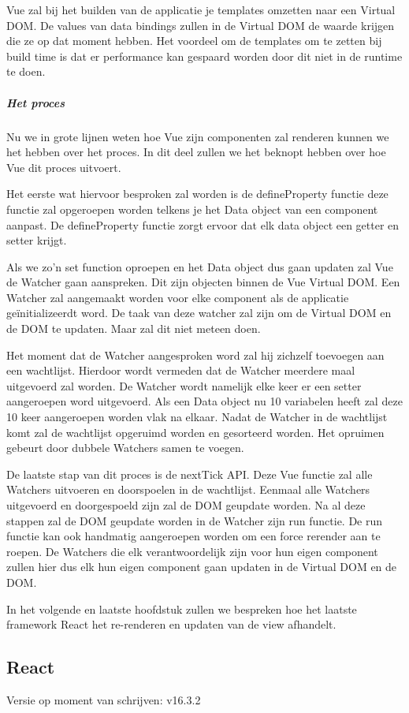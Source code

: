 Vue zal bij het builden van de applicatie je templates omzetten naar een Virtual DOM. De values van data bindings zullen in de Virtual DOM de waarde krijgen die ze op dat moment hebben. Het voordeel om de templates om te zetten bij build time is dat er performance kan gespaard worden door dit niet in de runtime te doen.

\subparagraph{Het proces}
Nu we in grote lijnen weten hoe Vue zijn componenten zal renderen kunnen we het hebben over het proces. In dit deel zullen we het beknopt hebben over hoe Vue dit proces uitvoert.

Het eerste wat hiervoor besproken zal worden is de defineProperty functie deze functie zal opgeroepen worden telkens je het Data object van een component aanpast. De defineProperty functie zorgt ervoor dat elk data object een getter en setter krijgt.

Als we zo’n set function oproepen en het Data object dus gaan updaten zal Vue de Watcher gaan aanspreken. Dit zijn objecten binnen de Vue Virtual DOM. Een Watcher zal aangemaakt worden voor elke component als de applicatie geïnitializeerdt word. De taak van deze watcher zal zijn om de Virtual DOM en de DOM te updaten. Maar zal dit niet meteen doen.

Het moment dat de Watcher aangesproken word zal hij zichzelf toevoegen aan een wachtlijst. Hierdoor wordt vermeden dat de Watcher meerdere maal uitgevoerd zal worden. De Watcher wordt namelijk elke keer er een setter aangeroepen word uitgevoerd. Als een Data object nu 10 variabelen heeft zal deze 10 keer aangeroepen worden vlak na elkaar. Nadat de Watcher in de wachtlijst komt zal de wachtlijst opgeruimd worden en gesorteerd worden. Het opruimen gebeurt door dubbele Watchers samen te voegen.

De laatste stap van dit proces is de nextTick API. Deze Vue functie zal alle Watchers uitvoeren en doorspoelen in de wachtlijst. Eenmaal alle Watchers uitgevoerd en doorgespoeld zijn zal de DOM geupdate worden. Na al deze stappen zal de DOM geupdate worden in de Watcher zijn run functie. De run functie kan ook handmatig aangeroepen worden om een force rerender aan te roepen. De Watchers die elk verantwoordelijk zijn voor hun eigen component zullen hier dus elk hun eigen component gaan updaten in de Virtual DOM en de DOM.

In het volgende en laatste hoofdstuk zullen we bespreken hoe het laatste framework React het re-renderen en updaten van de view afhandelt.


\subsection{React}
\label{sec:JavaScript_Frameworks_React}
Versie op moment van schrijven: v16.3.2

